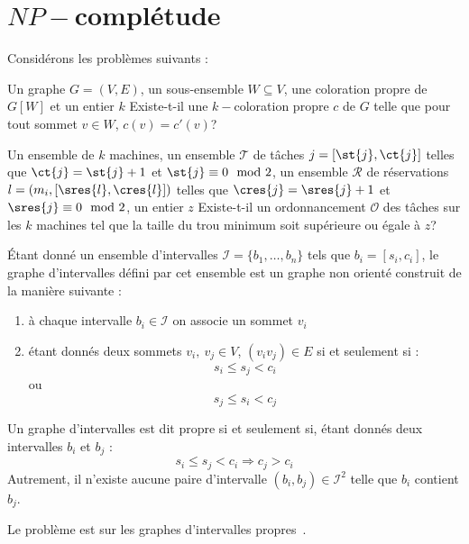 \documentclass[a4paper,11pt]{thesis}
\begin{document}
\section{$NP-$complétude}

Considérons les problèmes suivants :

\dfdec{\precolor}
{Un graphe $G=(V, E)$, un sous-ensemble $W \subseteq V$, une coloration propre de $G[W]$ et un
entier $k$}
{Existe-t-il une $k-$coloration propre $c$ de $G$ telle que pour tout sommet $v \in W$, $c(v) =
c'(v)$?}

\dfdec{\unitfischedpi}
{Un ensemble de $k$ machines, un ensemble $\mathcal{T}$ de tâches $j = [\st{j}, \ct{j}]$ telles que
$\ct{j} = \st{j} + 1$ et $\st{j} \equiv 0 \mod 2$, un ensemble $\mathcal{R}$ de réservations $l =
(m_i, [\sres{l}, \cres{l}])$ telles que $\cres{j} = \sres{j} + 1$ et $\sres{j} \equiv 0 \mod 2$, un
entier $z$}
{Existe-t-il un ordonnancement $\mathcal{O}$ des tâches sur les $k$ machines tel que la taille du
trou minimum soit supérieure ou égale à $z$?}

\begin{ndf}
    Étant donné un ensemble d'intervalles $\mathcal{I} = \{b_1, \dots, b_n\}$ tels que $b_i = [s_i,
    c_i]$, le graphe d'intervalles défini par cet ensemble est un graphe non orienté construit de la
    manière suivante :
    \begin{enumerate}
        \item à chaque intervalle $b_i \in \mathcal{I}$ on associe un sommet $v_i$
        \item étant donnés deux sommets $v_i,\ v_j \in V$, $(v_iv_j) \in E$ si et seulement si : \[
                s_i \leq s_j < c_i
            \]
            ou \[
                s_j \leq s_i < c_j
            \]
    \end{enumerate}

    Un graphe d'intervalles est dit propre si et seulement si, étant donnés deux intervalles $b_i$
    et $b_j$ : \[
        s_i \leq s_j < c_i \Rightarrow c_j > c_i
    \]
    Autrement, il n'existe aucune paire d'intervalle $(b_i, b_j) \in \mathcal{I}^2$ telle que $b_i$
    contient $b_j$.
\end{ndf}

\begin{nthrm}
    Le problème \precolor est \npc sur les graphes d'intervalles
    propres~\cite{marx2006precoloring}.
\end{nthrm}
\end{document}

